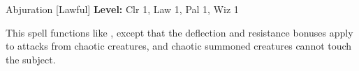 {Abjuration [Lawful]}
{
	\textbf{Level:}
	Clr 1, Law 1, Pal 1, Wiz 1\\
}
{
	This spell functions like , except that the deflection and resistance bonuses apply to attacks from chaotic creatures, and chaotic summoned creatures cannot touch the subject.

}
